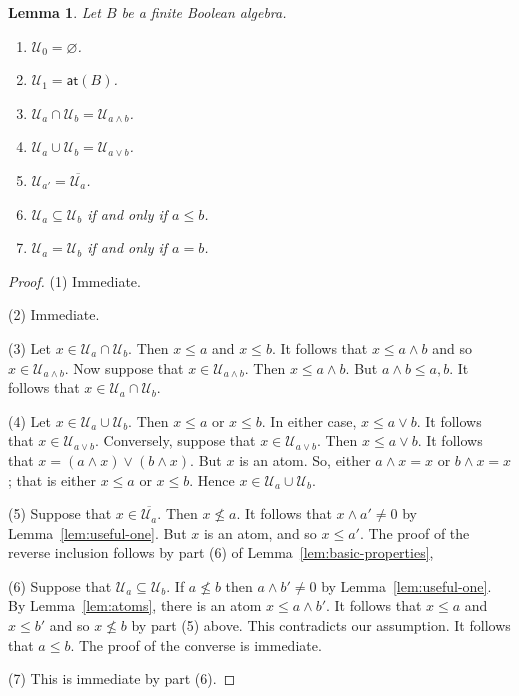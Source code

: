 \documentclass[a4paper]{amsart}
\newtheorem{lemma}[theorem]{Lemma}
\begin{document}
\begin{lemma}\label{lem:germany} Let $B$ be a finite Boolean algebra.
\begin{enumerate}

\item $\mathscr{U}_{0} = \varnothing$. 

\item $\mathscr{U}_{1} = \mathsf{at}(B)$.

\item $\mathscr{U}_{a} \cap \mathscr{U}_{b} = \mathscr{U}_{a \wedge b}$.

\item $\mathscr{U}_{a} \cup \mathscr{U}_{b} = \mathscr{U}_{a \vee b}$.

\item $\mathscr{U}_{a'} = \overline{\mathscr{U}_{a}}$.

\item $\mathscr{U}_{a} \subseteq \mathscr{U}_{b}$ if and only if $a \leq b$.

\item  $\mathscr{U}_{a} = \mathscr{U}_{b}$ if and only if $a = b$.

\end{enumerate}
\end{lemma}
\begin{proof} 
(1) Immediate.

(2) Immediate.

(3) Let $x \in \mathscr{U}_{a} \cap \mathscr{U}_{b}$.
Then $x \leq a$ and $x \leq b$.
It follows that $x \leq a \wedge b$ and so $x \in \mathscr{U}_{a \wedge b}$.
Now suppose that $x \in \mathscr{U}_{a \wedge b}$.
Then $x \leq a \wedge b$.
But $a \wedge b \leq a,b$.
It follows that $x \in \mathscr{U}_{a} \cap \mathscr{U}_{b}$.

(4) Let $x \in \mathscr{U}_{a} \cup \mathscr{U}_{b}$.
Then $x \leq a$ or $x \leq b$.
In either case, $x \leq a \vee b$.
It follows that $x \in \mathscr{U}_{a \vee b}$.
Conversely, suppose that $x \in \mathscr{U}_{a \vee b}$.
Then $x \leq a \vee b$.
It follows that $x = (a \wedge x) \vee (b \wedge x)$.
But $x$ is an atom.
So, either $a \wedge x = x$ or $b \wedge x = x$; 
that is either $x \leq a$ or $x \leq b$.
Hence $x \in \mathscr{U}_{a} \cup \mathscr{U}_{b}$.

(5) Suppose that $x \in \overline{\mathscr{U}_{a}}$.
Then $x \nleq a$. 
It follows that $x \wedge a' \neq 0$ by Lemma~\ref{lem:useful-one}.
But $x$ is an atom, and so $x \leq a'$.
The proof of the reverse inclusion follows by 
part (6) of Lemma~\ref{lem:basic-properties},

(6) Suppose that $\mathscr{U}_{a} \subseteq \mathscr{U}_{b}$. 
If $a \nleq b$ then $a \wedge b' \neq 0$
by Lemma~\ref{lem:useful-one}.
By Lemma~\ref{lem:atoms}, there is an atom $x \leq a \wedge b'$.
It follows that $x \leq a$ and $x \leq b'$ and so $x \nleq b$ by part (5) above.
This contradicts our assumption.
It follows that $a \leq b$.
The proof of the converse is immediate.

(7) This is immediate by part (6).
\end{proof}
\end{document}
